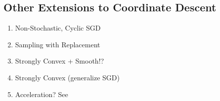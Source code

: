 	\subsection{Other Extensions to Coordinate Descent}
	\begin{enumerate}
		\item Non-Stochastic, Cyclic SGD
		\item Sampling with Replacement
		\item Strongly Convex + Smooth!?
		\item Strongly Convex (generalize SGD)
		\item Acceleration? See \cite{tu2017breaking}
	\end{enumerate}

